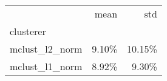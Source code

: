 \begin{tabular}{lrr}
\toprule
{} &  mean &    std \\
clusterer      &       &        \\
\midrule
mclust\_l2\_norm & 9.10\% & 10.15\% \\
mclust\_l1\_norm & 8.92\% &  9.30\% \\
\bottomrule
\end{tabular}

